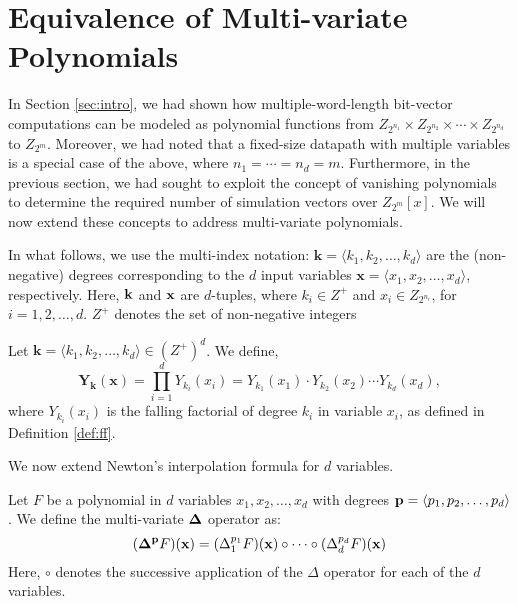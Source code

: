\section{Equivalence of Multi-variate Polynomials}\label{sec:multivar}

In Section \ref{sec:intro}, we had shown how multiple-word-length
bit-vector computations can be modeled as polynomial functions from
$Z_{2^{n_1}}\times Z_{2^{n_2}} \times \cdots \times Z_{2^{n_d}}$ to
$Z_{2^{m}}$.  Moreover, we had noted that a fixed-size datapath with
multiple variables is a special case of the above, where $n_1 = \cdots
= n_d = m$. Furthermore, in the previous section, we had sought to
exploit the concept of vanishing polynomials to determine the required
number of simulation vectors over $Z_{2^m}[x]$. We will now extend
these concepts to address multi-variate polynomials.

In what follows, we use the multi-index notation: $\textbf{k} =
\langle k_1, k_2, \ldots , k_d \rangle$ are the (non-negative) degrees
corresponding to the $d$ input variables $\textbf{x} = \langle x_1,
x_2, \ldots ,x_d \rangle$, respectively. Here, ${\bf k}$ and ${\bf x}$
are $d$-tuples, where $k_i \in Z^+$ and $x_i \in Z_{2^{n_i}}$, for $i
= 1, 2, \ldots, d$. $Z^+$ denotes the set of non-negative integers

\begin{Definition}
Let $\textbf{k} = \langle k_1, k_2, \ldots , k_d \rangle \in
(Z^+)^d$. We define,
\begin{equation}\label{eq:falling_fact}
\textbf{Y}_\textbf{k}(\textbf{x}) = \prod_{i=1}^{d}Y_{k_i}(x_i) =
Y_{k_1}(x_1) \cdot Y_{k_2}(x_2) \cdots Y_{k_d}(x_d),
\end{equation}
where $Y_{k_i}(x_i)$ is the falling factorial of degree $k_i$ in
variable $x_i$, as defined in Definition \ref{def:ff}.
\end{Definition}

We now extend Newton's interpolation formula for $d$ variables.

\begin{Definition}
Let $F$ be a polynomial in $d$ variables $x_1, x_2, \ldots, x_d$ with
degrees ${\bf p} = \langle p_1, p_2, \ldots, p_d \rangle$. We define
the multi-variate ${\bf \Delta}$ operator as:
\begin{equation}
({\bf \Delta}^{\bf p}F)({\bf x}) = (\Delta^{p_1}_1F)({\bf x})\circ \cdots
  \circ (\Delta^{p_d}_dF)({\bf x})\\
\end{equation}
Here, $\circ$ denotes the successive application of the $\Delta$ operator
for each of the $d$ variables.
\end{Definition}

